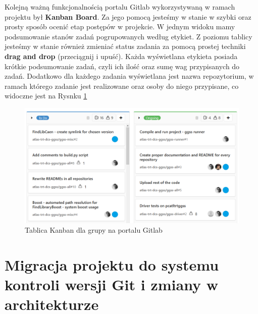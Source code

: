 \newpage

Kolejną ważną funkcjonalnością portalu Gitlab wykorzystywaną w ramach projektu był \textbf{Kanban Board}. Za jego pomocą jesteśmy w stanie w szybki oraz prosty sposób ocenić etap postępów w projekcie. W jednym widoku mamy podsumowanie stanów zadań pogrupowanych według etykiet. Z poziomu tablicy jesteśmy w stanie również zmieniać status zadania za pomocą prostej techniki \textbf{drag and drop} (przeciągnij i upuść). Każda wyświetlana etykieta posiada krótkie podsumowanie zadań, czyli ich ilość oraz sumę wag przypisanych do zadań. Dodatkowo dla każdego zadania wyświetlana jest nazwa repozytorium, w ramach którego zadanie jest realizowane oraz osoby do niego przypisane, co widoczne jest na Rysnku \ref{fig:kanban}

\begin{figure}[H]
\centering
\caption{Tablica Kanban dla grupy na portalu Gitlab}
\label{fig:kanban}
\includegraphics[width=\textwidth]{res/png/kanban}
\end{figure}

\section{Migracja projektu do systemu kontroli wersji Git i zmiany w architekturze}






